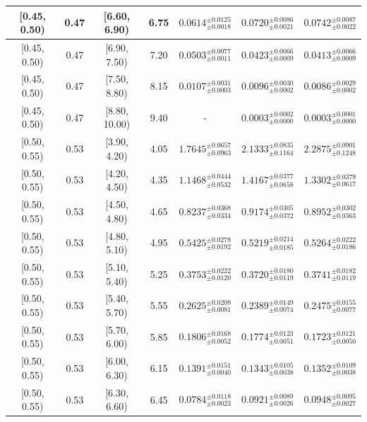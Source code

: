 \begin{longtable}{|c|c|c|c|c|c|c|}
\hline
[0.45, 0.50) & 0.47 & [6.60, 6.90) & 6.75 & $0.0614^{ \pm 0.0125 }_{ \pm 0.0018 }$ & $0.0720^{ \pm 0.0086 }_{ \pm 0.0021 }$ & $0.0742^{ \pm 0.0087 }_{ \pm 0.0022 }$ \\ 
\hline
[0.45, 0.50) & 0.47 & [6.90, 7.50) & 7.20 & $0.0503^{ \pm 0.0077 }_{ \pm 0.0011 }$ & $0.0423^{ \pm 0.0066 }_{ \pm 0.0009 }$ & $0.0413^{ \pm 0.0066 }_{ \pm 0.0009 }$ \\ 
\hline
[0.45, 0.50) & 0.47 & [7.50, 8.80) & 8.15 & $0.0107^{ \pm 0.0031 }_{ \pm 0.0003 }$ & $0.0096^{ \pm 0.0030 }_{ \pm 0.0002 }$ & $0.0086^{ \pm 0.0029 }_{ \pm 0.0002 }$ \\ 
\hline
[0.45, 0.50) & 0.47 & [8.80, 10.00) & 9.40 & - & $0.0003^{ \pm 0.0002 }_{ \pm 0.0000 }$ & $0.0003^{ \pm 0.0001 }_{ \pm 0.0000 }$ \\ 
\hline
[0.50, 0.55) & 0.53 & [3.90, 4.20) & 4.05 & $1.7645^{ \pm 0.0657 }_{ \pm 0.0963 }$ & $2.1333^{ \pm 0.0835 }_{ \pm 0.1164 }$ & $2.2875^{ \pm 0.0901 }_{ \pm 0.1248 }$ \\ 
\hline
[0.50, 0.55) & 0.53 & [4.20, 4.50) & 4.35 & $1.1468^{ \pm 0.0444 }_{ \pm 0.0532 }$ & $1.4167^{ \pm 0.0377 }_{ \pm 0.0658 }$ & $1.3302^{ \pm 0.0379 }_{ \pm 0.0617 }$ \\ 
\hline
[0.50, 0.55) & 0.53 & [4.50, 4.80) & 4.65 & $0.8237^{ \pm 0.0368 }_{ \pm 0.0334 }$ & $0.9174^{ \pm 0.0305 }_{ \pm 0.0372 }$ & $0.8952^{ \pm 0.0302 }_{ \pm 0.0363 }$ \\ 
\hline
[0.50, 0.55) & 0.53 & [4.80, 5.10) & 4.95 & $0.5425^{ \pm 0.0278 }_{ \pm 0.0192 }$ & $0.5219^{ \pm 0.0214 }_{ \pm 0.0185 }$ & $0.5264^{ \pm 0.0222 }_{ \pm 0.0186 }$ \\ 
\hline
[0.50, 0.55) & 0.53 & [5.10, 5.40) & 5.25 & $0.3753^{ \pm 0.0222 }_{ \pm 0.0120 }$ & $0.3720^{ \pm 0.0180 }_{ \pm 0.0119 }$ & $0.3741^{ \pm 0.0182 }_{ \pm 0.0119 }$ \\ 
\hline
[0.50, 0.55) & 0.53 & [5.40, 5.70) & 5.55 & $0.2625^{ \pm 0.0208 }_{ \pm 0.0081 }$ & $0.2389^{ \pm 0.0149 }_{ \pm 0.0074 }$ & $0.2475^{ \pm 0.0155 }_{ \pm 0.0077 }$ \\ 
\hline
[0.50, 0.55) & 0.53 & [5.70, 6.00) & 5.85 & $0.1806^{ \pm 0.0168 }_{ \pm 0.0052 }$ & $0.1774^{ \pm 0.0123 }_{ \pm 0.0051 }$ & $0.1723^{ \pm 0.0121 }_{ \pm 0.0050 }$ \\ 
\hline
[0.50, 0.55) & 0.53 & [6.00, 6.30) & 6.15 & $0.1391^{ \pm 0.0151 }_{ \pm 0.0040 }$ & $0.1343^{ \pm 0.0105 }_{ \pm 0.0038 }$ & $0.1352^{ \pm 0.0109 }_{ \pm 0.0038 }$ \\ 
\hline
[0.50, 0.55) & 0.53 & [6.30, 6.60) & 6.45 & $0.0784^{ \pm 0.0118 }_{ \pm 0.0023 }$ & $0.0921^{ \pm 0.0089 }_{ \pm 0.0026 }$ & $0.0948^{ \pm 0.0095 }_{ \pm 0.0027 }$ \\ 

\end{longtable}

